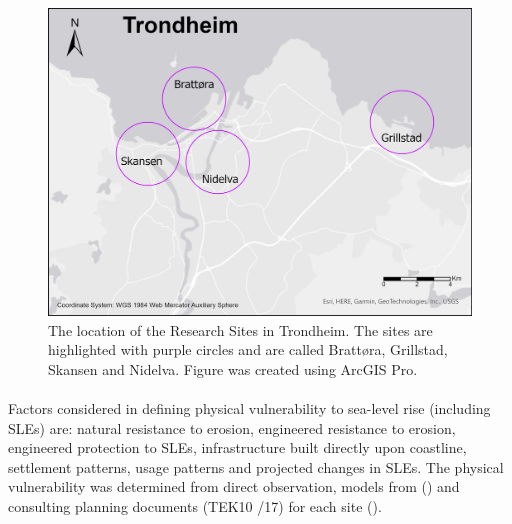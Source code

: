 \paragraph{}

\begin{figure} [h!]
    \centering
    \includegraphics[width=1.0\textwidth]{fig/trondheim_research_sites_grey_circles.png}
    \caption{ The location of the Research Sites in Trondheim. The sites are highlighted with purple circles and are called Brattøra, Grillstad, Skansen and Nidelva. Figure was created using ArcGIS Pro.}
    \label{fig:research_site}
\end{figure}

\paragraph{}


Factors considered in defining physical vulnerability to sea-level rise (including SLEs) are: natural resistance to erosion, engineered resistance to erosion, engineered protection to SLEs, infrastructure built directly upon coastline, settlement patterns, usage patterns and projected changes in SLEs. The physical vulnerability was determined from direct observation,  models from (\cite{kartverket_se_2020}) and consulting planning documents (TEK10 /17) for each site (\cite{miljoenheten_og_byplankontoret_trondheim_kommune_9-notat-om-havnivastigning-og-stormflo---hensyn-i-arealplanlegging-nyhavnapdf_2020}). 


